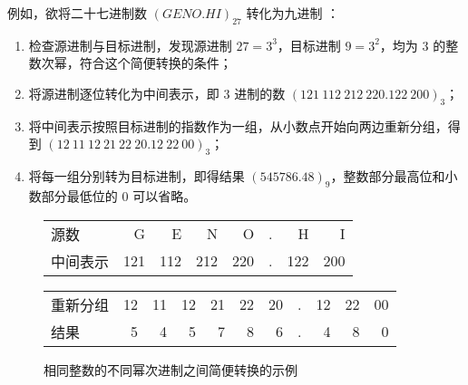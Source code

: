         例如，欲将二十七进制数 $(GENO.HI)_{27}$ 转化为九进制 ：
        \begin{enumerate}
            \item 检查源进制与目标进制，发现源进制 $27 = 3 ^ 3$，目标进制 $9 = 3 ^ 2$，均为 $3$ 的整数次幂，符合这个简便转换的条件；
            \item 将源进制逐位转化为中间表示，即 $3$ 进制的数 $(121\ 112\ 212\ 220.122\ 200)_3$；
            \item 将中间表示按照目标进制的指数作为一组，从小数点开始向两边重新分组，得到 $(12\ 11\ 12\ 21\ 22\ 20.12\ 22\ 00)_3$；
            \item 将每一组分别转为目标进制，即得结果 $(545786.48)_9$，整数部分最高位和小数部分最低位的 $0$ 可以省略。
        \end{enumerate}

        \begin{figure}
            \centering
            \begin{tabular}{lrrrrrrr}
                源数     &   G &   E &   N &   O & . &   H &   I \\
                中间表示 & 121 & 112 & 212 & 220 & . & 122 & 200 \\ \hline
            \end{tabular}
            \begin{tabular}{lrrrrrrrrrr}
                重新分组 & 12 & 11 & 12 & 21 & 22 & 20 & . & 12 & 22 & 00 \\
                结果     &  5 &  4 &  5 &  7 &  8 &  6 & . &  4  &  8 &  0
            \end{tabular}
            \caption{相同整数的不同幂次进制之间简便转换的示例}
            \label{fig:ArithBasics/positional-notation-conversion/powered-base/with-intermediate}
        \end{figure}
